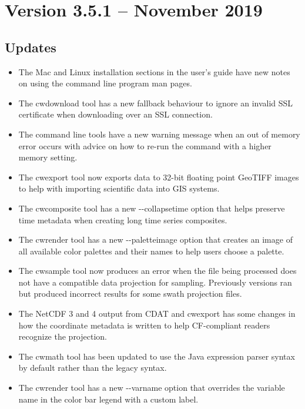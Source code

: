 
\section{Version 3.5.1 -- November 2019}

\subsection*{ Updates}

\begin{itemize}

  \item The Mac and Linux installation sections in the user's guide have
  new notes on using the command line program man pages.
  
  \item The cwdownload tool has a new fallback behaviour to ignore an invalid
  SSL certificate when downloading over an SSL connection.
  
  \item The command line tools have a new warning message when an out of
  memory error occurs with advice on how to re-run the command with a higher
  memory setting.
  
  \item The cwexport tool now exports data to 32-bit floating point GeoTIFF
  images to help with importing scientific data into GIS systems.
  
  \item The cwcomposite tool has a new  -{-}collapsetime option that helps
  preserve time metadata when creating long time series composites.
  
  \item The cwrender tool has a new -{-}paletteimage option that creates an
  image of all available color palettes and their names to help users choose a
  palette.
  
  \item The cwsample tool now produces an error when the file being processed
  does not have a compatible data projection for sampling.  Previously versions
  ran but produced incorrect results for some swath projection files.
  
  \item The NetCDF 3 and 4 output from CDAT and cwexport has some changes in how
  the coordinate metadata is written to help CF-compliant readers recognize
  the projection.
  
  \item The cwmath tool has been updated to use the Java expression parser
  syntax by default rather than the legacy syntax.
  
  \item The cwrender tool has a new -{-}varname option that overrides the
  variable name in the color bar legend with a custom label.

\end{itemize}

